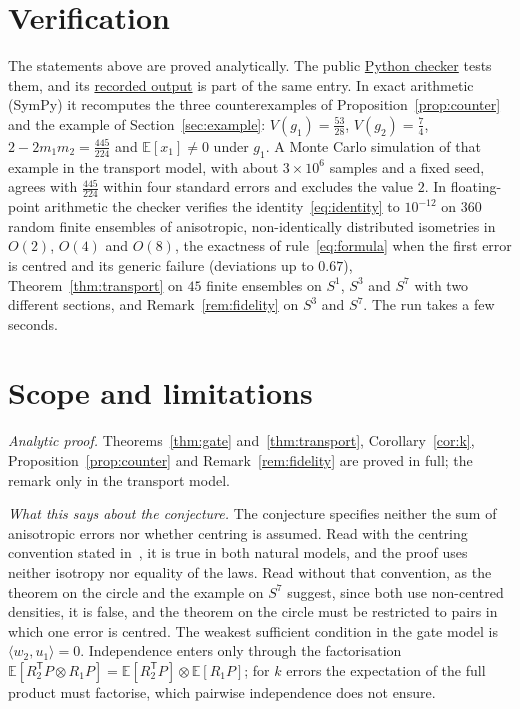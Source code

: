 \documentclass[11pt,a4paper]{article}
\theoremstyle{definition}
\theoremstyle{plain}
\newcommand{\E}{\mathbb{E}}
\newcommand{\T}{\mathsf{T}}
\newcommand{\ip}[2]{\langle#1,#2\rangle}
\begin{document}
\section{Verification}\label{sec:verification}
The statements above are proved analytically. The public
\href{https://github.com/jpbruneton/open_quantum_problems/blob/main/research/entries/variance-sum-quantum-errors/checks/check_variance_formula.py}{Python checker}
tests them, and its
\href{https://github.com/jpbruneton/open_quantum_problems/blob/main/research/entries/variance-sum-quantum-errors/data/verification.json}{recorded output}
is part of the same entry. In exact arithmetic (SymPy) it recomputes the three
counterexamples of Proposition~\ref{prop:counter} and the example of
Section~\ref{sec:example}: $V(g_1)=\tfrac{53}{28}$, $V(g_2)=\tfrac74$,
$2-2m_1m_2=\tfrac{445}{224}$ and $\E[x_1]\ne0$ under $g_1$. A Monte Carlo
simulation of that example in the transport model, with about $3\times10^6$
samples and a fixed seed, agrees with $\tfrac{445}{224}$ within four standard
errors and excludes the value $2$. In floating-point arithmetic the checker
verifies the identity~\eqref{eq:identity} to $10^{-12}$ on $360$ random finite
ensembles of anisotropic, non-identically distributed isometries in $O(2)$,
$O(4)$ and $O(8)$, the exactness of rule~\eqref{eq:formula} when the first
error is centred and its generic failure (deviations up to $0.67$),
Theorem~\ref{thm:transport} on $45$ finite ensembles on $S^1$, $S^3$ and $S^7$
with two different sections, and Remark~\ref{rem:fidelity} on $S^3$ and $S^7$.
The run takes a few seconds.

\section{Scope and limitations}\label{sec:scope}
\emph{Analytic proof.} Theorems~\ref{thm:gate} and~\ref{thm:transport},
Corollary~\ref{cor:k}, Proposition~\ref{prop:counter} and
Remark~\ref{rem:fidelity} are proved in full; the remark only in the
transport model.

\emph{What this says about the conjecture.} The conjecture specifies neither
the sum of anisotropic errors nor whether centring is assumed. Read with the
centring convention stated in~\cite{LacallePozo2019}, it is true in both
natural models, and the proof uses neither isotropy nor equality of the laws.
Read without that convention, as the theorem on the circle and the example on
$S^7$ suggest, since both use non-centred densities, it is false, and the
theorem on the circle must be restricted to pairs in which one error is
centred. The weakest sufficient condition in the gate model is
$\ip{w_2}{u_1}=0$. Independence enters only through the factorisation
$\E[R_2^\T P\otimes R_1P]=\E[R_2^\T P]\otimes\E[R_1P]$; for $k$ errors the
expectation of the full product must factorise, which pairwise independence
does not ensure.
\end{document}

